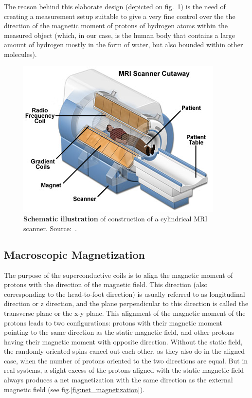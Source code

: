 The reason behind this elaborate design (depicted on fig.~\ref{fig:mri_schematic}) is the need of creating a measurement setup suitable to give a very fine control over the the direction of the magnetic moment of protons of hydrogen atoms within the measured object (which, in our case, is the human body that contains a large amount of hydrogen mostly in the form of water, but also bounded within other molecules).

\begin{figure}
    \centering
    \includegraphics[width=.5\linewidth]{images/mri-scanner.jpg}
    \caption{\textbf{Schematic illustration} of construction of a cylindrical MRI scanner. Source:~\cite{coyne_mri_2020}.}
    \label{fig:mri_schematic}
\end{figure}

\subsection{Macroscopic Magnetization}
The purpose of the superconductive coils is to align the magnetic moment of protons with the direction of the magnetic field. This direction (also corresponding to the head-to-foot direction) is usually referred to as longitudinal direction or z direction, and the plane perpendicular to this direction is called the transverse plane or the x-y plane. This alignment of the magnetic moment of the protons leads to two configurations: protons with their magnetic moment pointing to the same direction as the static magnetic field, and other protons having their magnetic moment with opposite direction. Without the static field, the randomly oriented spins cancel out each other, as they also do in the aligned case, when the number of protons oriented to the two directions are equal. But in real systems, a slight excess of the protons aligned with the static magnetic field always produces a net magnetization with the same direction as the external magnetic field (see fig.\ref{fig:net_magnetization}).

